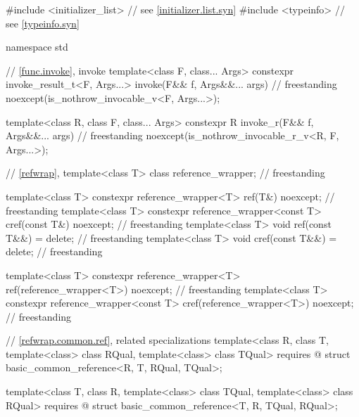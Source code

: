 %
%
%
\begin{codeblock}
#include <initializer_list>     // see \ref{initializer.list.syn}
#include <typeinfo>             // see \ref{typeinfo.syn}

namespace std {
  // \ref{func.invoke}, invoke
  template<class F, class... Args>
    constexpr invoke_result_t<F, Args...> invoke(F&& f, Args&&... args)             // freestanding
      noexcept(is_nothrow_invocable_v<F, Args...>);

  template<class R, class F, class... Args>
    constexpr R invoke_r(F&& f, Args&&... args)                                     // freestanding
      noexcept(is_nothrow_invocable_r_v<R, F, Args...>);

  // \ref{refwrap}, 
  template<class T> class reference_wrapper;                                        // freestanding

  template<class T> constexpr reference_wrapper<T> ref(T&) noexcept;                // freestanding
  template<class T> constexpr reference_wrapper<const T> cref(const T&) noexcept;   // freestanding
  template<class T> void ref(const T&&) = delete;                                   // freestanding
  template<class T> void cref(const T&&) = delete;                                  // freestanding

  template<class T>
    constexpr reference_wrapper<T> ref(reference_wrapper<T>) noexcept;              // freestanding
  template<class T>
    constexpr reference_wrapper<const T> cref(reference_wrapper<T>) noexcept;       // freestanding

  // \ref{refwrap.common.ref},  related specializations
  template<class R, class T, template<class> class RQual, template<class> class TQual>
    requires @\seebelow@
  struct basic_common_reference<R, T, RQual, TQual>;

  template<class T, class R, template<class> class TQual, template<class> class RQual>
    requires @\seebelow@
  struct basic_common_reference<T, R, TQual, RQual>;

}
\end{codeblock}
